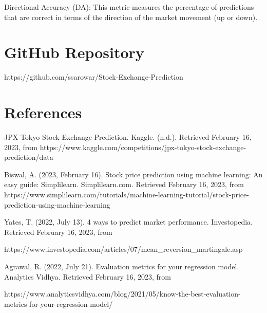 \documentclass{article}
\begin{document}
Directional Accuracy (DA): This metric measures the percentage of predictions that are correct in terms of the direction of the market movement (up or down).

\section{GitHub Repository }
https://github.com/ssarowar/Stock-Exchange-Prediction

\section{References}

\cite{JPX} 
JPX Tokyo Stock Exchange Prediction. Kaggle. (n.d.). Retrieved February 16, 2023, from https://www.kaggle.com/competitions/jpx-tokyo-stock-exchange-prediction/data 

\cite{Biswal} 
Biswal, A. (2023, February 16). Stock price prediction using machine learning: An easy guide: Simplilearn. Simplilearn.com. Retrieved February 16, 2023, from https://www.simplilearn.com/tutorials/machine-learning-tutorial/stock-price-prediction-using-machine-learning 

\cite{Yates} 
Yates, T. (2022, July 13). 4 ways to predict market performance. Investopedia. Retrieved February 16, 2023, from 

https://www.investopedia.com/articles/07/mean_reversion_martingale.asp 

\cite{Agrawal} 
Agrawal, R. (2022, July 21). Evaluation metrics for your regression model. Analytics Vidhya. Retrieved February 16, 2023, from 

https://www.analyticsvidhya.com/blog/2021/05/know-the-best-evaluation-metrics-for-your-regression-model/ 
\end{document}
